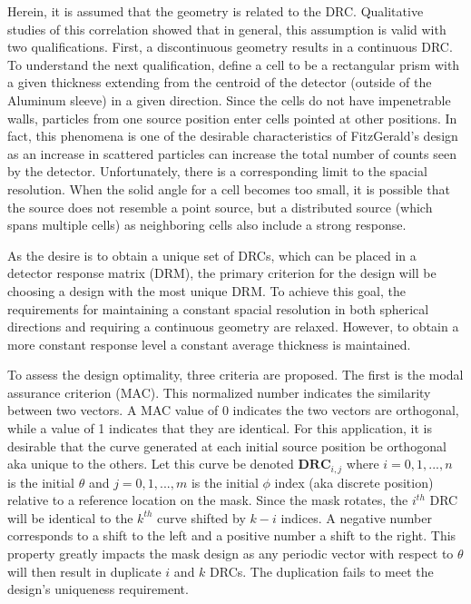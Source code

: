 \documentclass[3p,times]{elsarticle}
\begin{document}
Herein, it is assumed that the geometry is related to the DRC.  Qualitative studies of this correlation showed that in general, this 
assumption is valid with two qualifications.  First, a discontinuous geometry results in a continuous DRC.  To understand the next qualification, 
define a cell to be a rectangular prism with a given thickness extending from
the centroid of the detector (outside of the Aluminum sleeve) in a given direction.
Since the cells do not have impenetrable walls, particles from one source position
enter cells pointed at other positions.  In fact, this phenomena is one of the desirable characteristics of FitzGerald's design as an increase in scattered particles can increase
the total number of counts seen by the detector.  Unfortunately, there is a corresponding limit to the spacial resolution.  
When the solid angle for a cell becomes too small, it is possible that the source does not 
resemble a point source, but a distributed source (which spans multiple cells) as neighboring cells also include a strong response.

As the desire is to obtain a unique set of DRCs, which can be placed in a detector response matrix (DRM), the primary criterion for the design will be choosing a design with the most
unique DRM.  To achieve this goal, the requirements for maintaining a constant spacial resolution in both spherical directions and requiring a continuous
geometry are relaxed.  However, to obtain a more constant response level a constant average thickness is maintained.  

To assess the design optimality, three criteria are proposed.  The first is the modal assurance criterion (MAC).  This normalized number indicates the similarity 
between two vectors\cite{Allemang03}.  A MAC value of 0 indicates the two vectors are orthogonal, while a value of 1 indicates that they are identical.  
For this application, it is desirable that the curve generated at each initial source position be orthogonal aka unique to the others.  Let this curve be denoted 
$\mathbf{DRC}_{i,j}$ where $i=0,1,...,n$ is the initial $\theta$ 
and $j=0,1,...,m$ is the initial $\phi$ index (aka discrete position) relative to a reference location on the mask.  Since the mask rotates, the $i^{th}$ DRC will be identical to the 
$k^{th}$ curve shifted by $k-i$ indices.  A negative number corresponds to a shift to the left and a positive number a shift to the right.  This property greatly impacts the mask design as
any periodic vector with respect to $\theta$ will then result in duplicate $i$ and $k$ DRCs.  The duplication fails to meet the design's uniqueness requirement.
\end{document}
